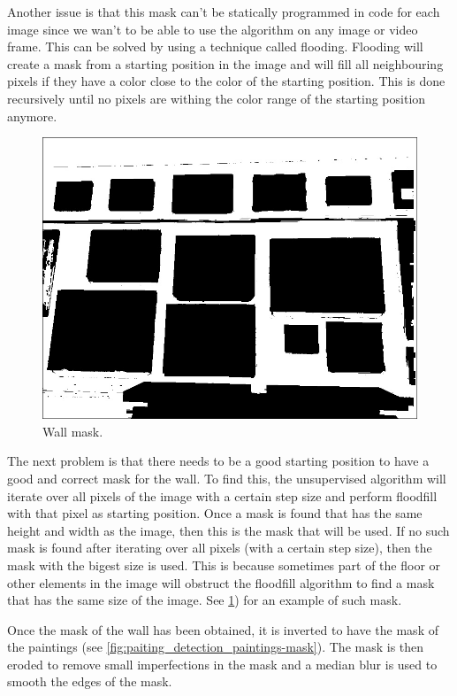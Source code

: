 Another issue is that this mask can't be statically programmed in code for each image since we wan't to be able to use the algorithm on any image or video frame. This can be solved by using a technique called flooding. Flooding will create a mask from a starting position in the image and will fill all neighbouring pixels if they have a color close to the color of the starting position. This is done recursively until no pixels are withing the color range of the starting position anymore.

\begin{figure}[h]
    \includegraphics[width=\linewidth]{images/IMG_20190323_121447_wall-mask.jpg}
    \caption{Wall mask.}
    \label{fig:paiting_detection_wall-mask}
\end{figure}

The next problem is that there needs to be a good starting position to have a good and correct mask for the wall. To find this, the unsupervised algorithm will iterate over all pixels of the image with a certain step size and perform floodfill with that pixel as starting position. Once a mask is found that has the same height and width as the image, then this is the mask that will be used. If no such mask is found after iterating over all pixels (with a certain step size), then the mask with the bigest size is used. This is because sometimes part of the floor or other elements in the image will obstruct the floodfill algorithm to find a mask that has the same size of the image. See \ref{fig:paiting_detection_wall-mask}) for an example of such mask.

Once the mask of the wall has been obtained, it is inverted to have the mask of the paintings (see \ref{fig:paiting_detection_paintings-mask}). The mask is then eroded to remove small imperfections in the mask and a median blur is used to smooth the edges of the mask.

